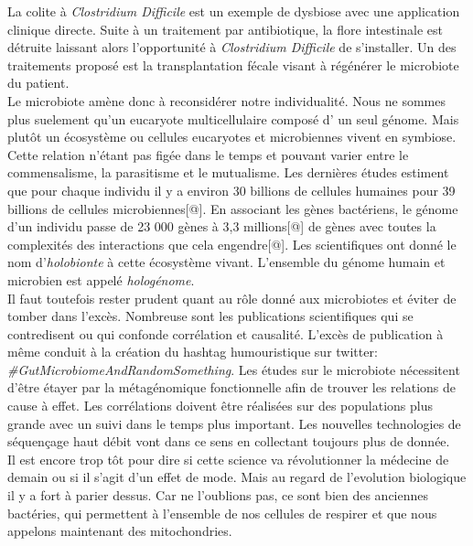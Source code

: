 \documentclass[12pt,a4paper]{article}
\begin{document}
La colite à \textit{Clostridium Difficile} est un exemple de dysbiose avec une application clinique directe. Suite à un traitement par antibiotique, la flore intestinale est détruite laissant alors l'opportunité à \textit{Clostridium Difficile} de s'installer. Un des traitements proposé est la transplantation fécale visant à régénérer le microbiote du patient. \\
Le microbiote amène donc à reconsidérer notre individualité. Nous ne sommes plus suelement qu'un eucaryote multicellulaire composé d' un seul génome. Mais plutôt un écosystème ou cellules eucaryotes et microbiennes vivent en symbiose. Cette relation n'étant pas figée dans le temps et pouvant varier entre le commensalisme, la parasitisme et le mutualisme. Les dernières études estiment que pour chaque individu il y a environ 30 billions de cellules humaines pour 39 billions de cellules microbiennes[@]. En associant les gènes bactériens, le génome d’un individu passe de 23 000 gènes à 3,3 millions[@] de gènes avec toutes la complexités des interactions que cela engendre[@]. Les scientifiques ont donné le nom d’\textit{holobionte} à cette écosystème vivant. L'ensemble du génome humain et microbien est appelé \textit{hologénome}. \\
Il faut toutefois rester prudent quant au rôle donné aux microbiotes et éviter de tomber dans l'excès. Nombreuse sont les publications scientifiques qui se contredisent ou qui confonde corrélation et causalité. L'excès de publication à même conduit à la création du hashtag humouristique sur twitter: \textit{\#GutMicrobiomeAndRandomSomething}. 
Les études sur le microbiote nécessitent d'être étayer par la métagénomique fonctionnelle afin de trouver les relations de cause à effet. Les corrélations doivent être réalisées sur des populations plus grande avec un suivi dans le temps plus important. Les nouvelles technologies de séquençage haut débit vont dans ce sens en collectant toujours plus de donnée.\\
Il est encore trop tôt pour dire si cette science va révolutionner la médecine de demain ou si il s'agit d'un effet de mode. Mais au regard de l'evolution biologique il y a fort à parier dessus. Car ne l'oublions pas, ce sont bien des anciennes bactéries, qui permettent à l'ensemble de nos cellules de respirer et que nous appelons maintenant des mitochondries.
\end{document}
